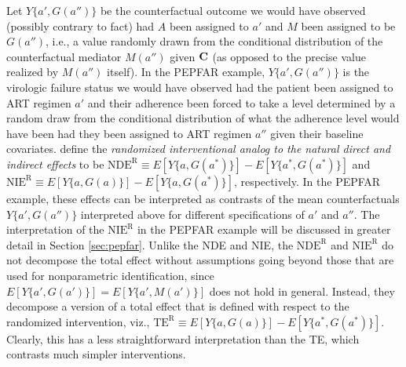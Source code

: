 \documentclass[12pt]{article}
\begin{document}
Let $Y\{a',G(a'')\}$ be the counterfactual outcome we would have observed (possibly contrary to fact) had $A$ been assigned to $a'$ and $M$ been assigned to be $G(a'')$, i.e., a value randomly drawn from the conditional distribution of the counterfactual mediator $M(a'')$ given ${\bf C}$ (as opposed to the precise value realized by $M(a'')$ itself). In the PEPFAR example, $Y\{a',G(a'')\}$ is the virologic failure status we would have observed had the patient been assigned to ART regimen $a'$ and their adherence been forced to take a level determined by a random draw from the conditional distribution of what the adherence level would have been had they been assigned to ART regimen $a''$ given their baseline covariates. \cite{vanderweele2014effect} define the \emph{randomized interventional analog to the natural direct and indirect effects} to be $\text{NDE}^{\text{R}}\equiv E[Y\{a,G(a^*)\}] - E[Y\{a^*,G(a^*)\}]$ and $\text{NIE}^{\text{R}}\equiv E[Y\{a,G(a)\}] - E[Y\{a,G(a^*)\}]$, respectively. In the PEPFAR example, these effects can be interpreted as contrasts of the mean counterfactuals $Y\{a',G(a'')\}$ interpreted above for different specifications of $a'$ and $a''$. The interpretation of the $\text{NIE}^{\text{R}}$ in the PEPFAR example will be discussed in greater detail in Section \ref{sec:pepfar}. Unlike the NDE and NIE, the $\text{NDE}^{\text{R}}$ and $\text{NIE}^{\text{R}}$ do not decompose the total effect without assumptions going beyond those that are used for nonparametric identification, since $E[Y\{a',G(a')\}] = E[Y\{a',M(a')\}]$ does not hold in general. Instead, they decompose a version of a total effect that is defined with respect to the randomized intervention, viz., $\text{TE}^{\text{R}}\equiv E[Y\{a,G(a)\}] - E[Y\{a^*,G(a^*)\}]$. Clearly, this has a less straightforward interpretation than the TE, which contrasts much simpler interventions.

\end{document}
